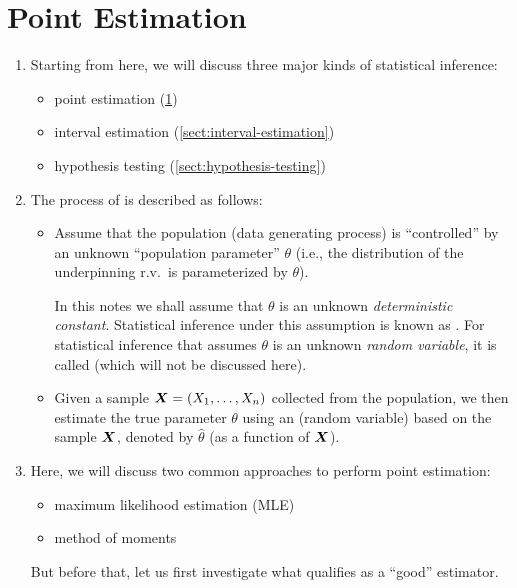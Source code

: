 \section{Point Estimation}
\label{sect:point-estimation}
\begin{enumerate}
\item Starting from here, we will discuss three major kinds of statistical
inference:
\begin{itemize}
\item point estimation (\cref{sect:point-estimation})
\item interval estimation (\cref{sect:interval-estimation})
\item hypothesis testing (\cref{sect:hypothesis-testing})
\end{itemize}
\item The process of  is described as follows:
\begin{itemize}
\item Assume that the population (data generating process) is ``controlled'' by
an unknown ``population parameter'' \(\theta\) (i.e., the distribution of the
underpinning r.v.\ is parameterized by \(\theta\)).

\begin{note}
In this notes we shall assume that \(\theta\) is an unknown \emph{deterministic
constant}. Statistical inference under this assumption is known as
.  For statistical inference that assumes
\(\theta\) is an unknown \emph{random variable}, it is called  (which will not be discussed here).
\end{note}

\item Given a sample \(\vb*{X}=(X_1,\dotsc,X_n)\) collected from the
population, we then estimate the true parameter \(\theta\) using an 
(random variable) based on the sample \(\vb*{X}\), denoted by \(\widehat{\theta}\)
(as a function of \(\vb*{X}\)).

\end{itemize}
\item Here, we will discuss two common approaches to perform point estimation:
\begin{itemize}
\item maximum likelihood estimation (MLE)
\item method of moments
\end{itemize}
But before that, let us first investigate what qualifies as a ``good''
estimator.


\end{enumerate}
